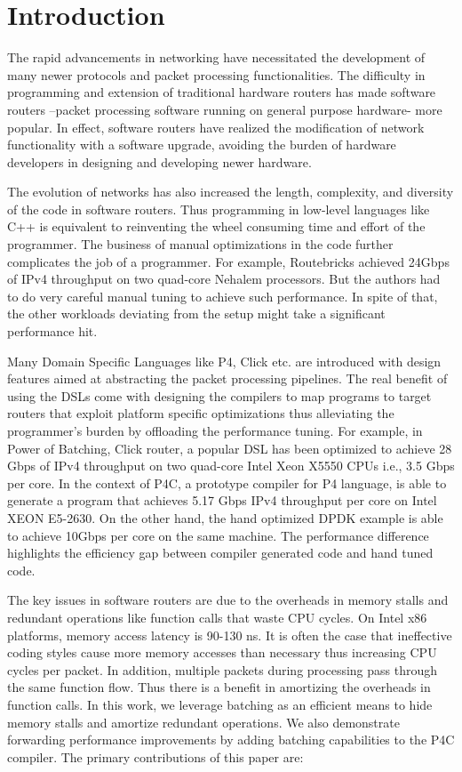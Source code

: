 \section{Introduction}

The rapid advancements in networking have necessitated the development of many newer protocols and packet processing functionalities. The difficulty in programming and extension of traditional hardware routers has made software routers --packet processing software running on general purpose hardware- more popular. In effect, software routers have realized the modification of network functionality with a software upgrade, avoiding the burden of hardware developers in designing and developing newer hardware.

The evolution of networks has also increased the length, complexity, and diversity of the code in software routers. Thus programming in low-level languages like C++ is equivalent to reinventing the wheel consuming time and effort of the programmer. The business of manual optimizations in the code further complicates the job of a programmer. For example, Routebricks achieved 24Gbps of IPv4 throughput on two quad-core Nehalem processors. But the authors had to do very careful manual tuning to achieve such performance. In spite of that, the other workloads deviating from the setup might take a significant performance hit.

Many Domain Specific Languages like P4\cite{Bosshart:2014:PPP:2656877.2656890}, Click\cite{kohler2000click} etc. are introduced with design features aimed at abstracting the packet processing pipelines. The real benefit of using the DSLs come with designing the compilers to map programs to target routers that exploit platform specific optimizations thus alleviating the programmer's burden by offloading the performance tuning. For example, in Power of Batching\cite{Kim:2012:PBC:2349896.2349910}, Click router, a popular DSL has been optimized to achieve 28 Gbps of IPv4 throughput on two quad-core Intel Xeon X5550 CPUs i.e., 3.5 Gbps per core. In the context of P4C, a prototype compiler for P4 language, is able to generate a program that achieves 5.17 Gbps IPv4 throughput per core on Intel XEON E5-2630. On the other hand, the hand optimized DPDK example is able to achieve 10Gbps per core on the same machine. The performance difference highlights the efficiency gap between compiler generated code and hand tuned code.

The key issues in software routers are due to the overheads in memory stalls and redundant operations like function calls that waste CPU cycles. On Intel x86 platforms, memory access latency is 90-130 ns. It is often the case that ineffective coding styles cause more memory accesses than necessary thus increasing CPU cycles per packet.  In addition, multiple packets during processing pass through the same function flow. Thus there is a benefit in amortizing the overheads in function calls. In this work, we leverage batching as an efficient means to hide memory stalls and amortize redundant operations. We also demonstrate forwarding performance improvements by adding batching capabilities to the P4C compiler. The primary contributions of this paper are:

